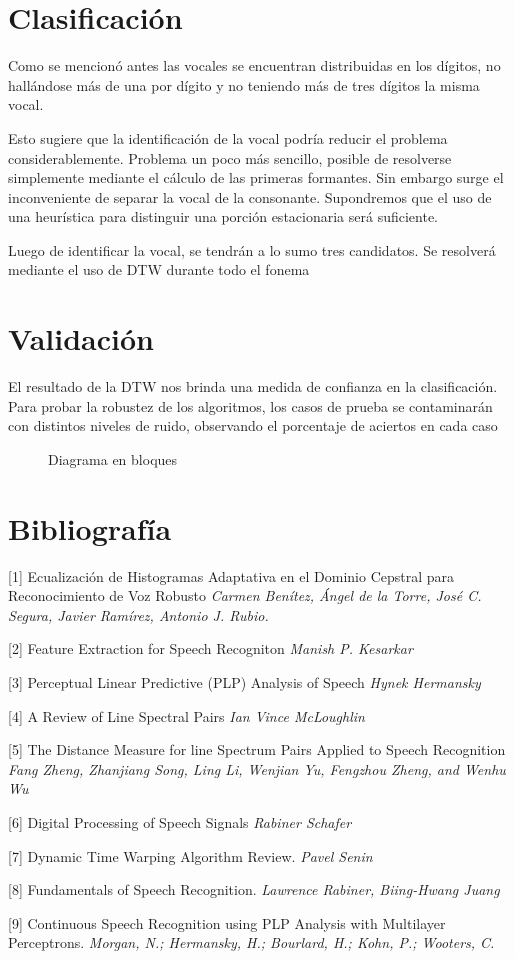 \documentclass[a4paper]{article}
\begin{document}
	\section{Clasificación}
		Como se mencionó antes las vocales se encuentran
		distribuidas en los dígitos, no hallándose más de
		una por dígito y no teniendo más de tres dígitos la
		misma vocal.

		Esto sugiere que la identificación de la vocal podría
		reducir el problema considerablemente.	Problema un poco
		más sencillo, posible de resolverse simplemente mediante
		el cálculo de las primeras formantes.	Sin embargo surge
		el inconveniente de separar la vocal de la consonante.
		Supondremos que el uso de una heurística para distinguir
		una porción estacionaria será suficiente.

		Luego de identificar la vocal, se tendrán a lo sumo
		tres candidatos.  Se resolverá mediante el uso de DTW
		durante todo el fonema

	\section{Validación}
		El resultado de la DTW nos brinda una medida de confianza
		en la clasificación.  Para probar la robustez de los
		algoritmos, los casos de prueba se contaminarán con
		distintos niveles de ruido, observando el porcentaje de
		aciertos en cada caso


\newpage
		\begin{figure}
			\fbox{
				
			}
			\caption{Diagrama en bloques}
		\end{figure}
	\section{Bibliografía}
		[1] Ecualización de Histogramas Adaptativa en
		el Dominio Cepstral para Reconocimiento de Voz Robusto
		\emph{Carmen Benítez, Ángel de la Torre, José C. Segura, Javier Ramírez, Antonio J. Rubio.}


		[2] Feature Extraction for Speech Recogniton
		\emph{Manish P. Kesarkar}


		[3] Perceptual Linear Predictive (PLP) Analysis of Speech
		\emph{Hynek Hermansky}


		[4] A Review of Line Spectral Pairs
		\emph{Ian Vince McLoughlin}


		[5] The Distance Measure for line Spectrum Pairs
		Applied to Speech Recognition
		\emph{Fang Zheng, Zhanjiang Song, Ling Li, Wenjian Yu, Fengzhou Zheng, and Wenhu Wu}


		[6] Digital Processing of Speech Signals
		\emph{Rabiner Schafer}


		[7] Dynamic Time Warping Algorithm Review.
		\emph{Pavel Senin}


		[8] Fundamentals of Speech Recognition.
		\emph{Lawrence Rabiner, Biing-Hwang Juang}

		[9] Continuous Speech Recognition using PLP Analysis with Multilayer Perceptrons.
		\emph{Morgan, N.; Hermansky, H.; Bourlard, H.; Kohn, P.; Wooters, C.}
		
	
\end{document}
